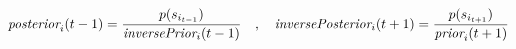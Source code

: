 \documentclass[article]{jss}
\newif\ifen
\newif\ifes
\newcommand{\en}[1]{\ifen#1\fi}
\newcommand{\es}[1]{\ifes#1\fi}
\begin{document}
\es{Los mensajes que no est\'an todav\'ia definidos, por ejemplo el prior inverso en la primer pasada hacia adelante, es remplazado por una forma neutral como distribuci\'on gaussiana con infinita varianza.}
%
\en{Finally, the messages that the variable $s_{i_t}$ sends to the past and the future are,}
\es{Finalmente, los mensajes que la variable $s_{i_t}$ env\'ia al pasado y al futuro son,}
%
\begin{equation*}
  \emph{posterior}_i(t-1) = \frac{p(s_{i_{t-1}})}{\emph{inversePrior}_i(t-1)} \ \ \ , \ \ \ \emph{inversePosterior}_i(t+1) = \frac{p(s_{i_{t+1}})}{\emph{prior}_i(t+1)}
\end{equation*}
%
% 
% 
% 
% 
% 
% 
\end{document}
